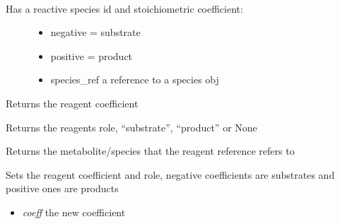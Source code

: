 \documentclass[a4paper,11pt,english]{sphinxmanual}
\begin{document}
\begin{fulllineitems}
\label{modules_doc:cbmpy.CBModel.Reagent}~\begin{description}
\item[{Has a reactive species id and stoichiometric coefficient:}] \leavevmode\begin{itemize}
\item {} 
negative = substrate

\item {} 
positive = product

\item {} 
species\_ref a reference to a species obj

\end{itemize}

\end{description}

\begin{fulllineitems}
\label{modules_doc:cbmpy.CBModel.Reagent.getCoefficient}
Returns the reagent coefficient

\end{fulllineitems}


\begin{fulllineitems}
\label{modules_doc:cbmpy.CBModel.Reagent.getRole}
Returns the reagents role, ``substrate'', ``product'' or None

\end{fulllineitems}


\begin{fulllineitems}
\label{modules_doc:cbmpy.CBModel.Reagent.getSpecies}
Returns the metabolite/species that the reagent reference refers to

\end{fulllineitems}


\begin{fulllineitems}
\label{modules_doc:cbmpy.CBModel.Reagent.setCoefficient}
Sets the reagent coefficient and role, negative coefficients are substrates and positive ones are products
\begin{itemize}
\item {} 
\emph{coeff} the new coefficient


\end{itemize}
\end{fulllineitems}
\end{fulllineitems}
\end{document}
